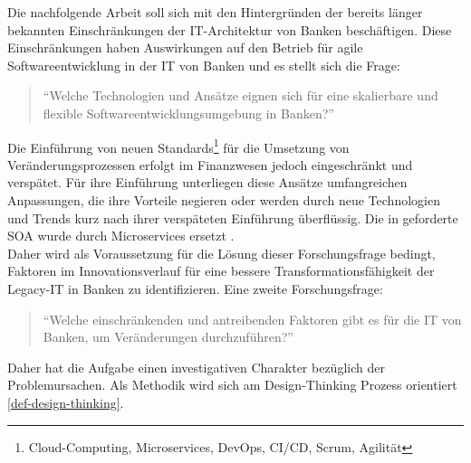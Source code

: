 Die nachfolgende Arbeit soll sich mit den Hintergründen der bereits länger bekannten Einschränkungen der IT-Architektur von Banken \cite{Brockhoff2006, Bussmann2006, Gupta:2017, Strietzel2018, Dorschel2018, Manz2018} beschäftigen.
Diese Einschränkungen haben Auswirkungen auf den Betrieb für agile Softwareentwicklung in der IT von Banken und es stellt sich die Frage:
\begin{quote}
    \enquote{Welche Technologien und Ansätze eignen sich für eine skalierbare und flexible Softwareentwicklungsumgebung in Banken?}
\end{quote}
%
Die Einführung von neuen Standards\footnote{Cloud-Computing, Microservices, DevOps, CI/CD, Scrum, Agilität}
für die Umsetzung von Veränderungsprozessen erfolgt im Finanzwesen jedoch eingeschränkt und verspätet. Für ihre Einführung unterliegen diese Ansätze umfangreichen Anpassungen, die ihre Vorteile negieren oder werden durch neue Technologien und Trends kurz nach ihrer verspäteten Einführung überflüssig. Die in \cite{Brockhoff2006} geforderte \ac{SOA} wurde durch Microservices ersetzt \cite[S. 80f]{Dorschel2018}.
\medskip
\\
Daher wird als Voraussetzung für die Lösung dieser Forschungsfrage bedingt, Faktoren im Innovationsverlauf \cite{Alt2017} für eine bessere Transformationsfähigkeit \cite{Koch2016} der Legacy-IT in Banken zu identifizieren. Eine zweite Forschungsfrage:
\begin{quote}
    \enquote{Welche einschränkenden und antreibenden Faktoren gibt es für die IT von Banken, um Veränderungen durchzuführen?}
\end{quote}
Daher hat die Aufgabe einen investigativen Charakter bezüglich der Problemursachen. Als Methodik wird sich am Design-Thinking Prozess orientiert \ref{def-design-thinking}.

